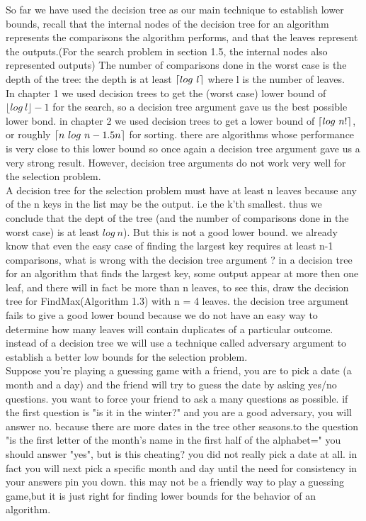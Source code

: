 \documentclass[a4paper,10pt,titlepage]{report}
\DeclarePairedDelimiter{\ceil}{\lceil}{\rceil}
\begin{document}
So far we have used the decision tree as our main technique to establish lower bounds, recall that the internal nodes of the decision tree for an algorithm represents the comparisons the algorithm performs, and that the leaves represent the outputs.(For the search problem in section 1.5, the internal nodes also represented outputs)
The number of comparisons done in the worst case is the depth of the tree: the depth is at least $\ceil{log \ l}$ where l is the number of leaves.\\
In chapter 1 we used decision trees to get the (worst case) lower bound of $\lfloor log \ l \rfloor-1$ for the search,  so a decision tree argument gave us the best possible lower bond. in chapter 2 we used decision trees to get a lower bound of $\ceil{ log \ n!}$, or roughly $\ceil{n \ log \ n -1.5n}$ for sorting. there are algorithms whose performance is very close to this lower bound so once again a decision tree argument gave us a very strong result. However, decision tree arguments do not work very well for the selection problem.\\
A decision tree for the selection problem must have at least n leaves because any of the n keys in the list may be the output. i.e the k'th smallest. thus we conclude that the dept of the tree (and the number of comparisons done in the worst case) is at least $log \ n$). But this is not a good lower bound. we already know that even the easy case of finding the largest key requires at least n-1 comparisons, what is wrong with the decision tree argument ? in a decision tree for an algorithm that finds the largest key, some output appear at more then one leaf, and there will in fact be more than n leaves, to see this, draw the decision tree for FindMax(Algorithm 1.3) with n = 4 leaves. the decision tree argument fails to give a good lower bound because we do not have an easy way to determine how many leaves will contain duplicates of a particular outcome. instead of a decision tree we will use a technique called adversary argument to establish a better low bounds for the selection problem.\\
Suppose you're playing a guessing game with a friend, you are to pick a date (a month and a day) and the friend will try to guess the date by asking yes/no questions. you want to force your friend to ask a many questions as possible. if the first question is "is it in the winter?" and you are a good adversary, you will answer no. because there are more dates in the tree other seasons.to the question "is the first letter of the month's name in the first half of the alphabet=" you should answer "yes", but is this cheating? you did not really pick a date at all. in fact you will next pick a specific month and day until the need for consistency in your answers pin you down. this may not be a friendly way to play a guessing game,but it is just right for finding lower bounds for the behavior of an algorithm.\\
\end{document}
